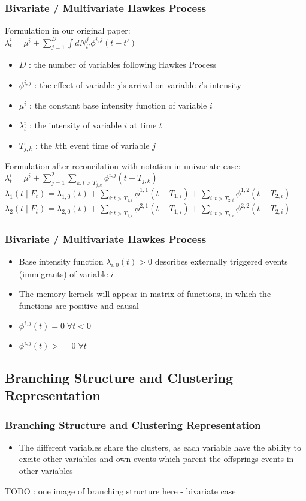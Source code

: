\documentclass{beamer}
\begin{document}
\begin{frame}
\frametitle{Bivariate / Multivariate Hawkes Process}
Formulation in our original paper:\\
$\lambda_t^i = \mu^i + \sum_{j=1}^D \int dN_{t'}^j \phi^{i,j} (t - t')$\\
\begin{itemize}
	\item $D$ : the number of variables following Hawkes Process
	\item $\phi^{i,j}$ : the effect of variable $j$'s arrival on variable $i$'s intensity
	\item $\mu^i$ : the constant base intensity function of variable $i$
	\item $\lambda_t^i$ : the intensity of variable $i$ at time $t$
	\item $T_{j,k}$ : the $k$th event time of variable $j$
\end{itemize}
Formulation after reconcilation with notation in univariate case:\\
$\lambda_t^i = \mu^i + \sum_{j=1}^2 \sum_{k: t > T_{j,k}} \phi^{i,j}(t - T_{j,k})$\\	
$\lambda_1(t \mid F_t) = \lambda_{1,0}(t) + \sum_{i: t > T_{1,i}} \phi^{1,1}(t - T_{1,i}) + \sum_{i: t > T_{2,i}} \phi^{1,2}(t - T_{2,i})$\\
$\lambda_2(t \mid F_t) = \lambda_{2,0}(t) + \sum_{i: t > T_{1,i}} \phi^{2,1}(t - T_{1,i}) + \sum_{i: t > T_{2,i}} \phi^{2,2}(t - T_{2,i})$
\end{frame}

\begin{frame}
\frametitle{Bivariate / Multivariate Hawkes Process}
\begin{itemize}
	\item Base intensity function $\lambda_{i,0}(t)>0$ describes externally triggered events (immigrants) of variable $i$
	\item The memory kernels will appear in matrix of functions, in which the functions are positive and causal
	\item $\phi^{i,j}(t) = 0 \; \forall t < 0$
	\item $\phi^{i,j}(t) >= 0 \; \forall t$
\end{itemize}
\end{frame}

\subsection{Branching Structure and Clustering Representation}
\begin{frame}
\frametitle{Branching Structure and Clustering Representation}
\begin{itemize}
	\item The different variables share the clusters, as each variable have the ability to excite other variables and own events which parent the offsprings events in other variables
\end{itemize}
TODO : one image of branching structure here - bivariate case
\end{frame}
\end{document}
